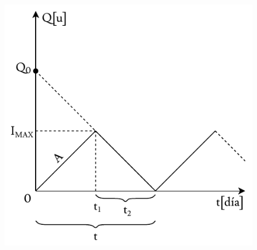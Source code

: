 \documentclass[10pt,letterpaper]{article}
\begin{document}
\begin{figure}[H]
\centering
\includegraphics[scale=0.8]{PROD.pdf}
\end{figure}
\end{document}

